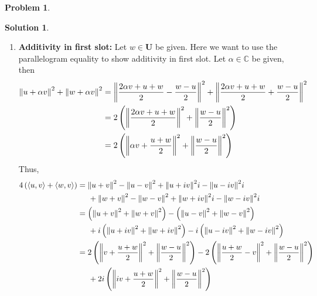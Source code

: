 \documentclass{article}
\theoremstyle{definition}
\newtheorem*{prob*}{Problem}
\newtheorem*{sln*}{Solution}
\newcommand{\U}{\mathbf{U}}
\newcommand{\la}{\langle}
\newcommand{\ra}{\rangle}
\begin{document}
\begin{prob*}
\begin{enumerate}
\begin{sln*}
\begin{enumerate}
				\item \textbf{Additivity in first slot:} Let $w\in \U$ be given. Here we want to use the parallelogram equality to show additivity in first slot. Let $\alpha \in \mathbb{C}$ be given, then
				\begin{align*}
				\norm{u + \alpha v}^2 + \norm{w + \alpha v}^2 &= \norm{\frac{2\alpha v+u+w}{2} - \frac{w-u}{2}}^2 + \norm{\frac{2\alpha v+u+w}{2} + \frac{w-u}{2}}^2 \\
				&= 2 \left( \norm{\frac{2\alpha v+ u + w}{2}}^2 + \norm{\frac{w-u}{2}}^2  \right)\\
				&= 2 \left( \norm{\alpha v  + \frac{u + w}{2}}^2 + \norm{\frac{w-u}{2}}^2  \right)\\
				\end{align*}
				Thus, 
				\begin{align*}
				4\left(\la u,v \ra + \la w,v \ra\right) 
				&= \norm{u+ v}^2  - \norm{u-v}^2 + \norm{u + iv}^2i - \norm{u - iv}^2i \\
				&\hspace{0.5cm}+ \norm{w+ v}^2  - \norm{w-v}^2 + \norm{w + iv}^2i - \norm{w - iv}^2i\\
				&=  \left(\norm{u+ v}^2 + \norm{w+ v}^2\right) - \left(\norm{u-v}^2 + \norm{w-v}^2 \right) \\ 
				&\hspace{0.5cm}+ i \left( \norm{u + iv}^2  + \norm{w + iv}^2 \right) - i\left(\norm{u - iv}^2 + \norm{w - iv}^2 \right) \\
				&= 2\left( \norm{ v + \frac{ u + w}{2}}^2 + \norm{\frac{w - u}{2}}^2 \right) 
				- 2\left( \norm{ \frac{u + w}{2} - v}^2 + \norm{\frac{w - u}{2}}^2 \right) \\
				&\hspace{0.5cm} + 2i\left( \norm{ iv + \frac{u + w}{2}}^2 + \norm{\frac{w - u}{2}}^2 \right)

\end{align*}
\end{enumerate}
\end{sln*}
\end{enumerate}
\end{prob*}
\end{document}
